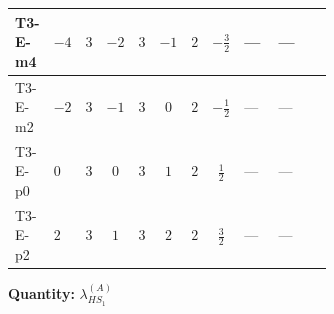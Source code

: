 \documentclass[8pt]{article}
\begin{document}
\begin{landscape}
\begin{longtable}{@{}llcccccc >{\raggedright\arraybackslash}p{0.21\linewidth} >{\raggedright\arraybackslash}p{0.21\linewidth} >{\raggedright\arraybackslash}p{0.21\linewidth}@{}}
\midrule
T3-E-m4 & $-4$ & $3$ & $-2$ & $3$ & $-1$ & $2$ & $-\frac{3}{2}$ & --- & --- & \scriptsize\adjustbox{max width=\linewidth}{$\begin{gathered} {\lambda_{HS_1}^{(A)}} (2 T_{\nu}^{(1)}+6 \operatorname{Tr}\!\left({Y_d}\,\left({Y_d}\right)^{\dagger}\right)+2 \operatorname{Tr}\!\left({Y_e}\,\left({Y_e}\right)^{\dagger}\right)+6 \operatorname{Tr}\!\left({Y_u}\,\left({Y_u}\right)^{\dagger}\right)+16 {\lambda_{S_1}^{(A)}})\end{gathered}$} \\
\midrule
T3-E-m2 & $-2$ & $3$ & $-1$ & $3$ & $0$ & $2$ & $-\frac{1}{2}$ & --- & --- & \scriptsize\adjustbox{max width=\linewidth}{$\begin{gathered} {\lambda_{HS_1}^{(A)}} (2 T_{\nu}^{(1)}+6 \operatorname{Tr}\!\left({Y_d}\,\left({Y_d}\right)^{\dagger}\right)+2 \operatorname{Tr}\!\left({Y_e}\,\left({Y_e}\right)^{\dagger}\right)+6 \operatorname{Tr}\!\left({Y_u}\,\left({Y_u}\right)^{\dagger}\right)+16 {\lambda_{S_1}^{(A)}})\end{gathered}$} \\
\midrule
T3-E-p0 & $0$ & $3$ & $0$ & $3$ & $1$ & $2$ & $\frac{1}{2}$ & --- & --- & \scriptsize\adjustbox{max width=\linewidth}{$\begin{gathered} {\lambda_{HS_1}^{(A)}} (2 T_{\nu}^{(1)}+6 \operatorname{Tr}\!\left({Y_d}\,\left({Y_d}\right)^{\dagger}\right)+2 \operatorname{Tr}\!\left({Y_e}\,\left({Y_e}\right)^{\dagger}\right)+6 \operatorname{Tr}\!\left({Y_u}\,\left({Y_u}\right)^{\dagger}\right)+16 {\lambda_{S_1}^{(A)}})\end{gathered}$} \\
\midrule
T3-E-p2 & $2$ & $3$ & $1$ & $3$ & $2$ & $2$ & $\frac{3}{2}$ & --- & --- & \scriptsize\adjustbox{max width=\linewidth}{$\begin{gathered} {\lambda_{HS_1}^{(A)}} (2 T_{\nu}^{(1)}+6 \operatorname{Tr}\!\left({Y_d}\,\left({Y_d}\right)^{\dagger}\right)+2 \operatorname{Tr}\!\left({Y_e}\,\left({Y_e}\right)^{\dagger}\right)+6 \operatorname{Tr}\!\left({Y_u}\,\left({Y_u}\right)^{\dagger}\right)+16 {\lambda_{S_1}^{(A)}})\end{gathered}$} \\
\midrule
\bottomrule
\end{longtable}
\clearpage
\noindent\textbf{Quantity: }$\lambda_{HS_1}^{(A)}$\par\smallskip

\end{landscape}
\end{document}
